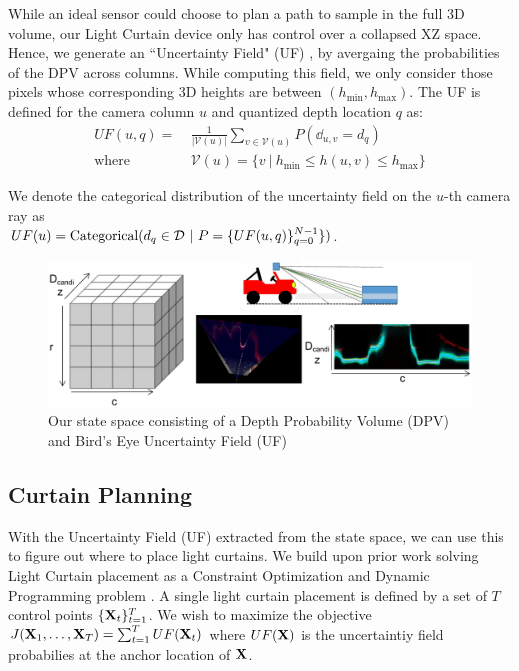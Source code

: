 While an ideal sensor could choose to plan a path to sample in the full 3D volume, our Light Curtain device only has control over a collapsed XZ  space. Hence, we generate an ``Uncertainty Field" (UF) \cite{yang2019inferring}, by avergaing the probabilities of the DPV across columns. While computing this field, we only consider those pixels whose corresponding 3D heights are between $(h_\text{min}, h_\text{max})$. The UF is defined for the camera column $u$ and quantized depth location $q$ as:
\begin{align}
   UF(u, q) =\ &\frac{1}{|\mathcal{V}(u)|}\sum_{v \in \mathcal{V}(u)} P(\dd_{u, v} = d_q)\nonumber\\
   \text{where } &\mathcal{V}(u) = \{v\ |\ h_\text{min} \leq h(u, v) \leq h_\text{max}\} 
   \label{eq:collapse}
\end{align}

We denote the categorical distribution of the uncertainty field on the $u$-th camera ray as \\$UF(u)=\text{Categorical}(d_q \in \D\ |\ P=\{UF(u, q)\}_{q=0}^{N-1}\})$. 

\begin{figure}[h]
   \centering
   \begin{minipage}{0.5\textwidth}
       \centering
       \includegraphics[width=1.0\textwidth]{figures/bev.pdf}
   \end{minipage}\hfill
   \centering
   \caption{Our state space consisting of a Depth Probability Volume (DPV) and Bird's Eye Uncertainty Field (UF)}
\end{figure}

\subsection{Curtain Planning}

With the Uncertainty Field (UF) extracted from the state space, we can use this to figure out where to place light curtains. We build upon prior work solving Light Curtain placement as a Constraint Optimization and Dynamic Programming problem \cite{Ancha_2020_ECCV}. A single light curtain placement is defined by a set of $T$ control points $\{\mathbf{X}_t\}_{t=1}^T$. We wish to maximize the objective $J(\mathbf{X}_1, \dots, \mathbf{X}_T) = \sum_{t=1}^T UF(\mathbf{X}_t)$ where $UF(\mathbf{X})$ is the uncertaintiy field probabilies at the anchor location of $\mathbf{X}$.

